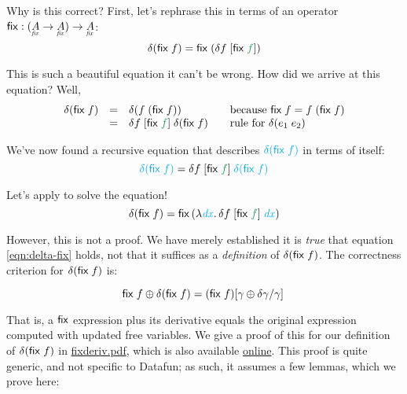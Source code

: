 \documentclass{article}
\theoremstyle{plain}
\theoremstyle{definition}
\newcommand{\preserve}[1]{{\color{ForestGreen}{#1}}}
\begin{document}
Why is this correct? First, let's rephrase this in terms of an operator
$\ms{fix} : (\fixtype{A} \to \fixtype{A}) \to \fixtype{A}$:
\begin{equation}
  \delta(\ms{fix}\; f) = \ms{fix}\; (\delta f \;\disc{\ms{fix}\; \preserve{f}})
\end{equation}

This is such a beautiful equation it can't be wrong. How did we arrive at this
equation? Well,
\[
\begin{array}{rcl>{\hspace{1em}}l}
  \delta(\ms{fix}\; f)
  &=& \delta(f \;(\ms{fix}\;f))
  & \text{because}~\ms{fix}\; f = f\;(\ms{fix}\;f)\\
  &=& \delta f \;\disc{\ms{fix}\; \preserve{f}} \; \delta(\ms{fix}\; f)
  & \text{rule for}~\delta(e_1\;e_2)
\end{array}
\]

We've now found a recursive equation that describes
${\color{Cyan}\delta(\ms{fix}\;f)}$ in terms of itself:
\begin{equation}\label{eqn:delta-fix}
  {\color{Cyan} \delta(\ms{fix}\;f)}
  = \delta f\;\disc{\ms{fix}\; \preserve{f}}\;{\color{Cyan}\delta(\ms{fix}\;f)}
\end{equation}

Let's apply  to solve the equation!
\begin{equation}
  \delta(\ms{fix}\; f)
  =
  \ms{fix}\,(\lam{\m{\color{Cyan} dx}}
  \delta f \;\disc{\ms{fix}\;\preserve{f}} \;{\m{\color{Cyan} dx}})
\end{equation}

However, this is not a proof. We have merely established it is \emph{true} that equation \ref{eqn:delta-fix} holds, not that it suffices as a \emph{definition} of $\delta(\mathsf{fix}\;f)$. The correctness criterion for $\delta(\mathsf{fix}\; f)$ is:

\begin{equation}
  \mathsf{fix}\;f \oplus \delta(\mathsf{fix}\;f)
  = (\mathsf{fix}\;f)[{\gamma \oplus \delta\gamma/\gamma}]\,
\end{equation}

That is, a $\mathsf{fix}$ expression plus its derivative equals the original
expression computed with updated free variables. We give a proof of this for our
definition of $\delta(\mathsf{fix}\;f)$ in \url{fixderiv.pdf}, which is also
available \href{http://www.rntz.net/files/fixderiv.pdf}{online}. This proof is
quite generic, and not specific to Datafun; as such, it assumes a few lemmas,
which we prove here:
\end{document}
